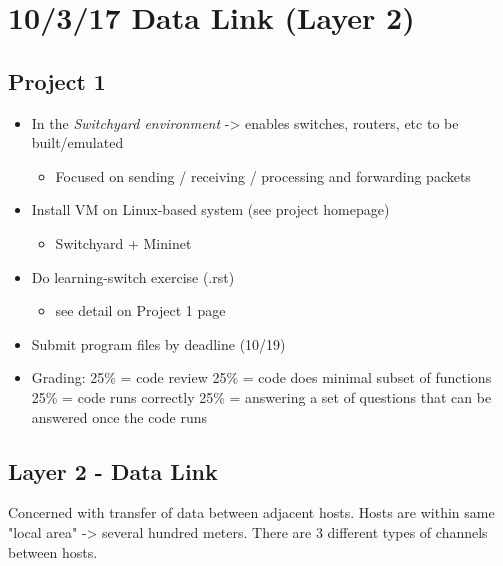 \documentclass[11pt]{article}
\begin{document}
\section{10/3/17  Data Link (Layer 2)}
\label{sec:orgheadline38}

\subsection{Project 1}
\label{sec:orgheadline31}
\begin{itemize}
\item In the \emph{Switchyard environment} -> enables switches, routers, etc to be built/emulated
\begin{itemize}
\item Focused on sending / receiving / processing and forwarding packets
\end{itemize}

\item Install VM on Linux-based system (see project homepage)
\begin{itemize}
\item Switchyard + Mininet
\end{itemize}
\item Do learning-switch exercise (.rst)
\begin{itemize}
\item see detail on Project 1 page
\end{itemize}
\item Submit program files by deadline (10/19)
\item Grading:
25\% = code review
25\% = code does minimal subset of functions
25\% = code runs correctly
25\% = answering a set of questions that can be answered once the code runs
\end{itemize}

\subsection{Layer 2 - Data Link}
\label{sec:orgheadline32}
Concerned with transfer of data between adjacent hosts. Hosts are within same
"local area" -> several hundred meters. There are 3 different types of
channels between hosts.
\end{document}
